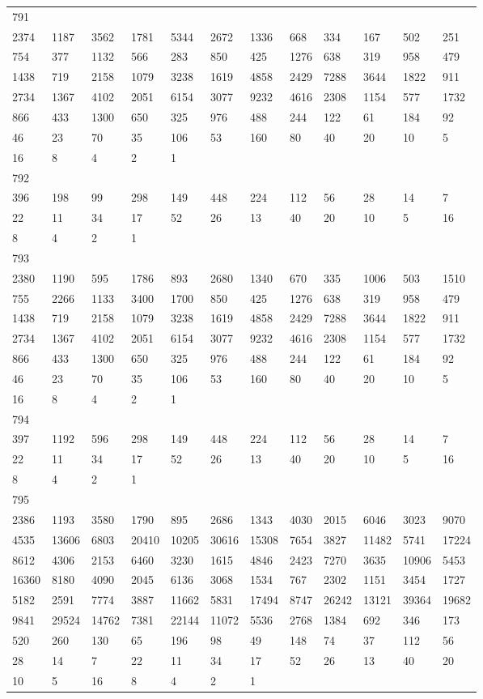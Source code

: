 \begin{longtable}{llllllllllll}
791&&&&&&&&&&&\\
2374& 1187& 3562& 1781& 5344& 2672& 1336& 668& 334& 167& 502& 251\\
754& 377& 1132& 566& 283& 850& 425& 1276& 638& 319& 958& 479\\
1438& 719& 2158& 1079& 3238& 1619& 4858& 2429& 7288& 3644& 1822& 911\\
2734& 1367& 4102& 2051& 6154& 3077& 9232& 4616& 2308& 1154& 577& 1732\\
866& 433& 1300& 650& 325& 976& 488& 244& 122& 61& 184& 92\\
46& 23& 70& 35& 106& 53& 160& 80& 40& 20& 10& 5\\
16& 8& 4& 2& 1& \\

792&&&&&&&&&&&\\
396& 198& 99& 298& 149& 448& 224& 112& 56& 28& 14& 7\\
22& 11& 34& 17& 52& 26& 13& 40& 20& 10& 5& 16\\
8& 4& 2& 1& \\

793&&&&&&&&&&&\\
2380& 1190& 595& 1786& 893& 2680& 1340& 670& 335& 1006& 503& 1510\\
755& 2266& 1133& 3400& 1700& 850& 425& 1276& 638& 319& 958& 479\\
1438& 719& 2158& 1079& 3238& 1619& 4858& 2429& 7288& 3644& 1822& 911\\
2734& 1367& 4102& 2051& 6154& 3077& 9232& 4616& 2308& 1154& 577& 1732\\
866& 433& 1300& 650& 325& 976& 488& 244& 122& 61& 184& 92\\
46& 23& 70& 35& 106& 53& 160& 80& 40& 20& 10& 5\\
16& 8& 4& 2& 1& \\

794&&&&&&&&&&&\\
397& 1192& 596& 298& 149& 448& 224& 112& 56& 28& 14& 7\\
22& 11& 34& 17& 52& 26& 13& 40& 20& 10& 5& 16\\
8& 4& 2& 1& \\

795&&&&&&&&&&&\\
2386& 1193& 3580& 1790& 895& 2686& 1343& 4030& 2015& 6046& 3023& 9070\\
4535& 13606& 6803& 20410& 10205& 30616& 15308& 7654& 3827& 11482& 5741& 17224\\
8612& 4306& 2153& 6460& 3230& 1615& 4846& 2423& 7270& 3635& 10906& 5453\\
16360& 8180& 4090& 2045& 6136& 3068& 1534& 767& 2302& 1151& 3454& 1727\\
5182& 2591& 7774& 3887& 11662& 5831& 17494& 8747& 26242& 13121& 39364& 19682\\
9841& 29524& 14762& 7381& 22144& 11072& 5536& 2768& 1384& 692& 346& 173\\
520& 260& 130& 65& 196& 98& 49& 148& 74& 37& 112& 56\\
28& 14& 7& 22& 11& 34& 17& 52& 26& 13& 40& 20\\
10& 5& 16& 8& 4& 2& 1& \\


\end{longtable}

